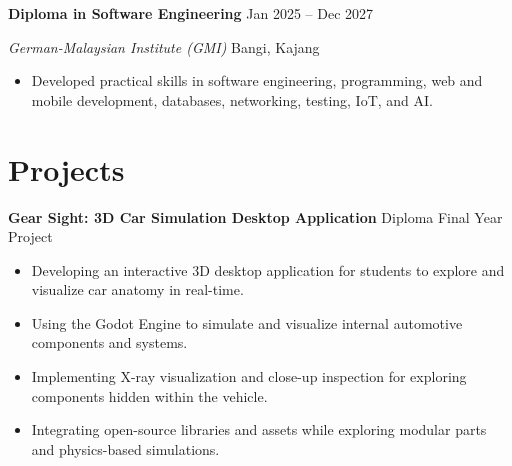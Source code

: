 \documentclass[10pt,a4paper]{article}
\begin{document}
\textbf{Diploma in Software Engineering}
\hfill Jan 2025 -- Dec 2027

\textit{German-Malaysian Institute (GMI)}
\hfill Bangi, Kajang

\begin{itemize}
    \item Developed practical skills in software engineering, programming,
    web and mobile development, databases, networking, testing, IoT, and AI.
\end{itemize}

\section{Projects}

\textbf{Gear Sight: 3D Car Simulation Desktop Application}
\hfill Diploma Final Year Project

\begin{itemize}
    \item Developing an interactive 3D desktop application for students to explore and visualize car anatomy in real-time.
    \item Using the Godot Engine to simulate and visualize internal automotive components and systems.
    \item Implementing X-ray visualization and close-up inspection for exploring components hidden within the vehicle.
    \item Integrating open-source libraries and assets while exploring modular parts and physics-based simulations.
\end{itemize}


\end{document}
